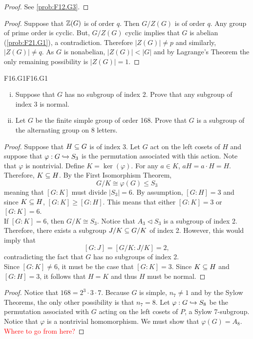 \documentclass[../AlgebraQualSolutions.tex]{subfiles}
\begin{document}
	\begin{proof}
		See \ref{prob:F12.G3}.
	\end{proof}

	\begin{proof}
		Suppose that $\mathbb{Z}(G)$ is of order $q$. Then $G/Z(G)$ is of order $q$. Any group of prime order is cyclic. But, $G/Z(G)$ cyclic implies that $G$ is abelian (\ref{prob:F21.G1}), a contradiction. Therefore $|Z(G)| \neq p$ and similarly, $|Z(G)| \neq q$. As $G$ is nonabelian, $|Z(G)| < |G|$ and by Lagrange's Theorem the only remaining possibility is $|Z(G)| =1$.
	\end{proof}


	\begin{prob}{F16.G1}{F16.G1}
		\begin{enumerate}[(i)]
			\item Suppose that $G$ has no subgroup of index 2. Prove that any subgroup of index 3 is normal.
			\item Let $G$ be the finite simple group of order 168. Prove that $G$ is a subgroup of the alternating group on 8 letters.
		\end{enumerate}
	\end{prob}

	\begin{proof}
		Suppose that $H \subseteq G$ is of index 3. Let $G$ act on the left cosets of $H$ and suppose that $\varphi: G \xhookrightarrow{} S_3$ is the permutation associated with this action. Note that $\varphi$ is nontrivial. Define $K = \ker(\varphi)$. For any $a \in K$, $aH = a \cdot H = H$. Therefore, $K \subseteq H$. By the First Isomorphism Theorem,
			\[G/K \cong \varphi(G) \leq S_3 \]
		meaning that $[G:K]$ must divide $|S_3| = 6$. By assumption, $[G:H] = 3$ and since $K \subseteq H$, $[G:K] \geq [G:H]$. This means that either $[G:K] = 3$ or $[G:K] = 6$.\\

		If $[G:K] = 6$, then $G/K \cong S_3$. Notice that $A_3 \triangleleft S_3$ is a subgroup of index 2. Therefore, there exists a subgroup $J/K \subseteq G/K$ of index 2. However, this would imply that
			\[[G:J] = [G/K: J/K] = 2,\]
		contradicting the fact that $G$ has no subgroups of index 2.\\

		Since $[G:K] \neq 6$, it must be the case that $[G:K] = 3$. Since $K \subseteq H$ and $[G:H] = 3$, it follows that $H = K$ and thus $H$ must be normal.
	\end{proof}

	\begin{proof}
		Notice that $168 = 2^3\cdot3\cdot7$. Because $G$ is simple, $n_7 \neq 1$ and by the Sylow Theorems, the only other possibility is that $n_7 = 8$. Let $\varphi: G \xhookrightarrow{} S_8$ be the permutation associated with $G$ acting on the left cosets of $P$, a Sylow 7-subgroup. Notice that $\varphi$ is a nontrivial homomorphism. We must show that $\varphi(G) = A_8$. \textcolor{red}{Where to go from here?}
	\end{proof}
\end{document}
